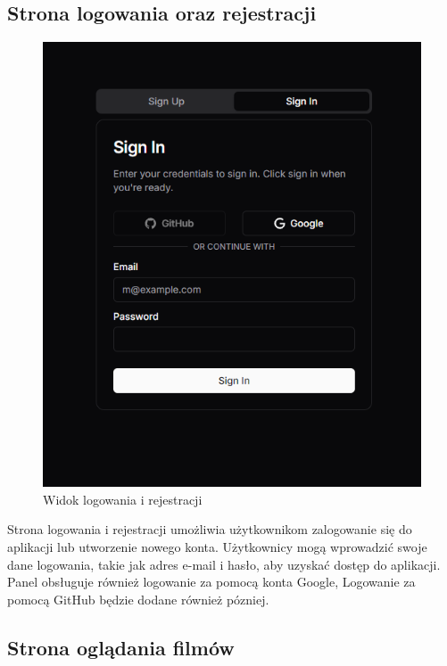 \subsection{Strona logowania oraz rejestracji}

\begin{figure}[H]
    \centering
    \includegraphics[width=1\textwidth]{IMAGE/LoginPage.png}
    \caption{Widok logowania i rejestracji}
    \label{fig:Logowanie i rejestracja}
\end{figure}
Strona logowania i rejestracji umożliwia użytkownikom zalogowanie się do aplikacji lub utworzenie nowego konta. Użytkownicy mogą wprowadzić swoje dane logowania, takie jak adres e-mail i hasło, aby uzyskać dostęp do aplikacji. Panel obsługuje również logowanie za pomocą konta Google, Logowanie za pomocą GitHub będzie dodane również pózniej.
\subsection{Strona oglądania filmów}


